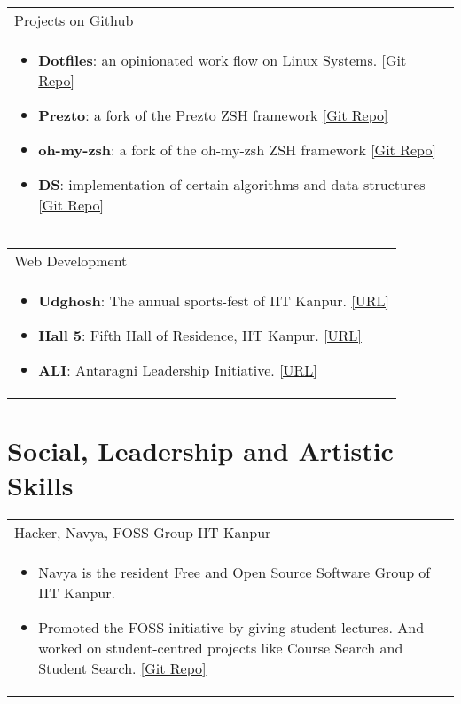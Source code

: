 \documentclass[a4paper,10pt]{article} %
\newcommand{\projectlist}[2]{
    \begin{tabular}{p{\linewidth}}
        \textcolor{NavyBlue}{#1}\\
        \vspace{-0.3cm}
        \footnotesize{#2}
    \end{tabular}
    \vspace{-0.4cm}
}
\begin{document}
\projectlist {Projects on Github}
             {
                 \begin{itemize}
                     \item \textbf{Dotfiles}: an opinionated work flow on Linux Systems.
                         \href{https://github.com/srijanshetty/dotfiles} {[Git Repo]}
                     \item \textbf{Prezto}: a fork of the Prezto ZSH framework
                         \href{https://github.com/srijanshetty/prezto} {[Git Repo]}
                     \item \textbf{oh-my-zsh}: a fork of the oh-my-zsh ZSH framework
                         \href{https://github.com/srijanshetty/oh-my-zsh} {[Git Repo]}
                     \item \textbf{DS}: implementation of certain algorithms and data structures
                         \href{https://github.com/srijanshetty/DS} {[Git Repo]}
                 \end{itemize}
             }

\projectlist {Web Development}
             {
                 \begin{itemize}
                     \item \textbf{Udghosh}: The annual sports-fest of IIT Kanpur.
                         \href{www.udghosh.org} {[URL]}
                     \item \textbf{Hall 5}: Fifth Hall of Residence, IIT Kanpur.
                         \href{http://www.iitk.ac.in/hall5} {[URL]}
                     \item \textbf{ALI}: Antaragni Leadership Initiative.
                         \href{www.antargni.in/ali} {[URL]}
                 \end{itemize}
             }



\section {Social, Leadership and Artistic Skills}

\projectlist {Hacker, Navya, FOSS Group IIT Kanpur}
             {
                   \begin{itemize}
                       \item Navya is the resident Free and Open Source Software Group of IIT Kanpur.
                       \item Promoted the FOSS initiative by giving student lectures.
                           And worked on student-centred projects like Course Search and Student Search.
                           \href{https://github.com/navya} {[Git Repo]}
                   \end{itemize}
             }
\end{document}
